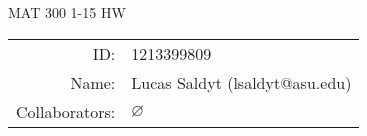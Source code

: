 \documentclass[notitlepage]{homework}
\author{Lucas Saldyt}
\title{\AssignmentName}
\newcommand{\AssignmentName}{MAT 300 1-15 HW}
\begin{document}

\begin{titlepage}
	\begin{center}
		{\Large \AssignmentName}
		
		\bigskip

		\begin{tabular}{rl}
			ID: & 1213399809 \\ %
            Name: & Lucas Saldyt (lsaldyt@asu.edu) \\ %
			Collaborators: & $\varnothing$
		\end{tabular}

		\bigskip

	\end{center}

	\toccontents

	\vfill

\end{titlepage}






\end{document}

